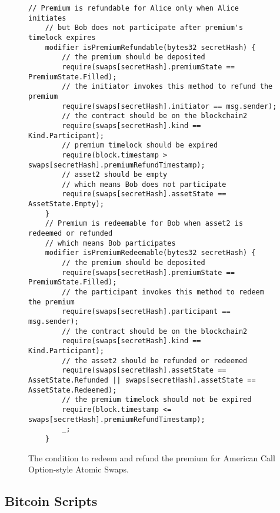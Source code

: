 \begin{figure}
    \begin{lstlisting}[language=Solidity, basicstyle=\tiny]
    // Premium is refundable for Alice only when Alice initiates
    // but Bob does not participate after premium's timelock expires
    modifier isPremiumRefundable(bytes32 secretHash) {
        // the premium should be deposited
        require(swaps[secretHash].premiumState == PremiumState.Filled);
        // the initiator invokes this method to refund the premium
        require(swaps[secretHash].initiator == msg.sender);
        // the contract should be on the blockchain2
        require(swaps[secretHash].kind == Kind.Participant);
        // premium timelock should be expired
        require(block.timestamp > swaps[secretHash].premiumRefundTimestamp);
        // asset2 should be empty
        // which means Bob does not participate
        require(swaps[secretHash].assetState == AssetState.Empty);
    }
    // Premium is redeemable for Bob when asset2 is redeemed or refunded
    // which means Bob participates
    modifier isPremiumRedeemable(bytes32 secretHash) {
        // the premium should be deposited
        require(swaps[secretHash].premiumState == PremiumState.Filled);
        // the participant invokes this method to redeem the premium
        require(swaps[secretHash].participant == msg.sender);
        // the contract should be on the blockchain2
        require(swaps[secretHash].kind == Kind.Participant);
        // the asset2 should be refunded or redeemed
        require(swaps[secretHash].assetState == AssetState.Refunded || swaps[secretHash].assetState == AssetState.Redeemed);
        // the premium timelock should not be expired
        require(block.timestamp <= swaps[secretHash].premiumRefundTimestamp);
        _;
    }
    \end{lstlisting}
    \label{code:premium_condition_options}
    \caption{The condition to redeem and refund the premium for American Call Option-style Atomic Swaps.}
\end{figure}

\subsection{Bitcoin Scripts}

